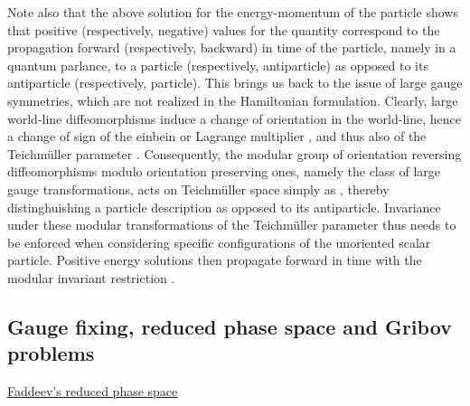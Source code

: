 \documentclass[a4paper,11pt]{article}
\def\Z{\mathbb Z}
\begin{document}
Note also that the above solution for the energy-momentum of the particle
shows that positive (respectively, negative) values for the quantity \myHighlight{$\gamma$}\coordHE{}
correspond to the propagation forward (respectively, backward) in time of the
particle, namely in a quantum parlance, to a particle (respectively, 
antiparticle) as opposed to its antiparticle (respectively, particle). 
This brings us back to the
issue of large gauge symmetries, which are not realized in the Hamiltonian
formulation. Clearly, large world-line diffeomorphisms induce a change
of orientation in the world-line, hence a change of sign of the einbein
\coordHE{} or Lagrange multiplier \myHighlight{$\lambda(\tau)$}\coordHE{}, and thus also of
the Teichm\"uller parameter \myHighlight{$\gamma$}\coordHE{}. Consequently, the \myHighlight{$\Z_2$}\coordHE{} modular
group of orientation reversing diffeomorphisms modulo orientation preserving
ones, namely the class of large gauge transformations, acts on Teichm\"uller
space simply as \myHighlight{$\gamma\rightarrow -\gamma$}\coordHE{}, thereby dis\-tin\-ghui\-shing a
particle description as opposed to its antiparticle.\cite{JG1} Invariance under
these modular transformations of the Teichm\"uller parameter thus needs to
be enforced when considering specific configurations of the unoriented
scalar particle. Positive energy solutions then propagate forward in time
with the modular invariant restriction \coordHE{}.

\subsection{Gauge fixing, reduced phase space and Gribov problems}
\label{Subsect5.3}

\vspace{10pt}

\noindent\underline{Faddeev's reduced phase space}

\vspace{5pt}
\end{document}
